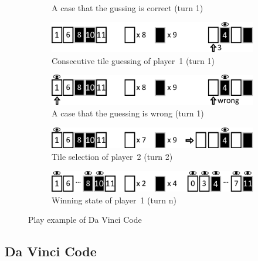 \begin{figure}
\begin{subfigure}[b]{0.95\columnwidth}
\caption{A case that the gussing is correct (turn 1)}
\label{fig:DVC_procedure_5}
\end{subfigure}
\par\smallskip
\begin{subfigure}[b]{0.95\columnwidth}
\includegraphics[width=0.95\columnwidth]{figures/DVC_procedure_6.pdf}
\caption{Consecutive tile guessing of player~1 (turn 1)}
\label{fig:DVC_procedure_6}
\end{subfigure}
\par\smallskip
\begin{subfigure}[b]{0.95\columnwidth}
\includegraphics[width=0.95\columnwidth]{figures/DVC_procedure_7.pdf}
\caption{A case that the guessing is wrong (turn 1)}
\label{fig:DVC_procedure_7}
\end{subfigure}
\par\smallskip
\begin{subfigure}[b]{0.95\columnwidth}
\includegraphics[width=0.95\columnwidth]{figures/DVC_procedure_8.pdf}
\caption{Tile selection of player~2 (turn 2)}
\label{fig:DVC_procedure_8}
\end{subfigure}
\par\smallskip
\begin{subfigure}[b]{0.95\columnwidth}
\includegraphics[width=0.95\columnwidth]{figures/DVC_procedure_9.pdf}
\caption{Winning state of player~1 (turn n)}
\label{fig:DVC_procedure_9}
\end{subfigure}
\caption{Play example of Da Vinci Code}
\end{figure}

\subsection{Da Vinci Code} \label{sec:davinci}

